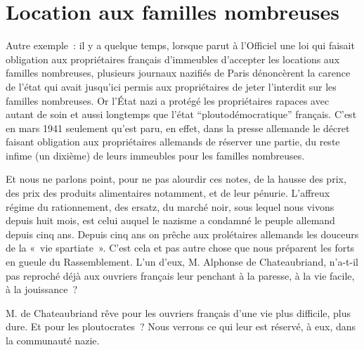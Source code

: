 \documentclass[french,twoside]{book} %
\begin{document}
\section[{Location aux familles nombreuses}]{Location aux familles nombreuses}
\noindent Autre exemple : il y a quelque temps, lorsque parut à l’Officiel une loi qui faisait obligation aux propriétaires français d’immeubles d’accepter les locations aux familles nombreuses, plusieurs journaux nazifiés de Paris dénoncèrent la carence de l’état qui avait jusqu’ici permis aux propriétaires de jeter l’interdit sur les familles nombreuses. Or l’État nazi a protégé les propriétaires rapaces avec autant de soin et aussi longtemps que l’état “ploutodémocratique” français. C’est en mars 1941 seulement qu’est paru, en effet, dans la presse allemande le décret faisant obligation aux propriétaires allemands de réserver une partie, du reste infime (un dixième) de leurs immeubles pour les familles nombreuses.\par
Et nous ne parlons point, pour ne pas alourdir ces notes, de la hausse des prix, des prix des produits alimentaires notamment, et de leur pénurie. L’affreux régime du rationnement, des ersatz, du marché noir, sous lequel nous vivons depuis huit mois, est celui auquel le nazisme a condamné le peuple allemand depuis cinq ans. Depuis cinq ans on prêche aux prolétaires allemands les douceurs de la « vie spartiate ». C’est cela et pas autre chose que nous préparent les forts en gueule du Rassemblement. L’un d’eux, M. Alphonse de Chateaubriand, n’a-t-il pas reproché déjà aux ouvriers français leur penchant à la paresse, à la vie facile, à la jouissance ?\par
M. de Chateaubriand rêve pour les ouvriers français d’une vie plus difficile, plus dure. Et pour les ploutocrates ? Nous verrons ce qui leur est réservé, à eux, dans la communauté nazie.
\end{document}
